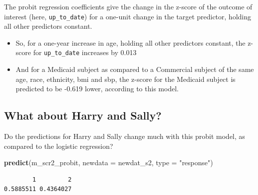 \documentclass[]{book}
\newenvironment{Shaded}{\begin{snugshade}}{\end{snugshade}}
\newcommand{\KeywordTok}[1]{\textcolor[rgb]{0.13,0.29,0.53}{\textbf{#1}}}
\newcommand{\DataTypeTok}[1]{\textcolor[rgb]{0.13,0.29,0.53}{#1}}
\newcommand{\StringTok}[1]{\textcolor[rgb]{0.31,0.60,0.02}{#1}}
\newcommand{\NormalTok}[1]{#1}
\providecommand{\tightlist}{%
  \setlength{\itemsep}{0pt}\setlength{\parskip}{0pt}}
\theoremstyle{definition}
\theoremstyle{definition}
\theoremstyle{definition}
\theoremstyle{remark}
\begin{document}
The probit regression coefficients give the change in the z-score of the
outcome of interest (here, \texttt{up\_to\_date}) for a one-unit change
in the target predictor, holding all other predictors constant.

\begin{itemize}
\tightlist
\item
  So, for a one-year increase in age, holding all other predictors
  constant, the z-score for \texttt{up\_to\_date} increases by 0.013
\item
  And for a Medicaid subject as compared to a Commercial subject of the
  same age, race, ethnicity, bmi and sbp, the z-score for the Medicaid
  subject is predicted to be -0.619 lower, according to this model.
\end{itemize}

\subsection{What about Harry and
Sally?}\label{what-about-harry-and-sally}

Do the predictions for Harry and Sally change much with this probit
model, as compared to the logistic regression?

\begin{Shaded}
\begin{Highlighting}[]
\KeywordTok{predict}\NormalTok{(m_scr2_probit, }\DataTypeTok{newdata =}\NormalTok{ newdat_s2, }\DataTypeTok{type =} \StringTok{"response"}\NormalTok{)}
\end{Highlighting}
\end{Shaded}

\begin{verbatim}
        1         2 
0.5885511 0.4364027 
\end{verbatim}


\end{document}
